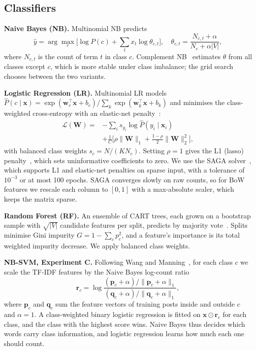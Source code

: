 \documentclass[conference]{IEEEtran}
\begin{document}
\subsection{Classifiers}

\textbf{Naive Bayes (NB).} Multinomial NB predicts
\begin{equation}
\hat{y}=\arg\max_c\Big[\log P(c)+\sum_t x_{t}\log\theta_{c,t}\Big],\quad
\theta_{c,t}=\frac{N_{c,t}+\alpha}{N_c+\alpha|V|},
\label{eq:nb}
\end{equation}
where $N_{c,t}$ is the count of term $t$ in class $c$. Complement NB~\cite{rennie2003tackling} estimates $\theta$ from all classes except $c$, which is more stable under class imbalance; the grid search chooses between the two variants.

\textbf{Logistic Regression (LR).} Multinomial LR models $\hat{P}(c\mid\mathbf{x})=\exp(\mathbf{w}_c^\top\mathbf{x}+b_c)/\sum_k\exp(\mathbf{w}_k^\top\mathbf{x}+b_k)$ and minimises the class-weighted cross-entropy with an elastic-net penalty~\cite{zou2005elasticnet}:
\begin{equation}
\begin{split}
\mathcal{L}(\mathbf{W})={}&-\sum_i s_{y_i}\log \hat{P}(y_i\mid\mathbf{x}_i)\\
&+\frac{1}{C}\Big[\rho\lVert \mathbf{W}\rVert_1+\frac{1-\rho}{2}\lVert \mathbf{W}\rVert_2^2\Big],
\end{split}
\label{eq:lr}
\end{equation}
with balanced class weights $s_c=N/(K N_c)$. Setting $\rho=1$ gives the L1 (lasso) penalty~\cite{tibshirani1996lasso}, which sets uninformative coefficients to zero. We use the SAGA solver~\cite{defazio2014saga}, which supports L1 and elastic-net penalties on sparse input, with a tolerance of $10^{-3}$ or at most 100 epochs. SAGA converges slowly on raw counts, so for BoW features we rescale each column to $[0,1]$ with a max-absolute scaler, which keeps the matrix sparse.

\textbf{Random Forest (RF).} An ensemble of CART trees, each grown on a bootstrap sample with $\sqrt{|V|}$ candidate features per split, predicts by majority vote~\cite{breiman2001rf}. Splits minimise Gini impurity $G=1-\sum_c p_c^2$, and a feature's importance is its total weighted impurity decrease. We apply balanced class weights.

\textbf{NB-SVM, Experiment C.} Following Wang and Manning~\cite{wang2012baselines}, for each class $c$ we scale the TF-IDF features by the Naive Bayes log-count ratio
\begin{equation}
\mathbf{r}_c=\log\frac{(\mathbf{p}_c+\alpha)/\lVert\mathbf{p}_c+\alpha\rVert_1}{(\mathbf{q}_c+\alpha)/\lVert\mathbf{q}_c+\alpha\rVert_1},
\label{eq:nbsvm}
\end{equation}
where $\mathbf{p}_c$ and $\mathbf{q}_c$ sum the feature vectors of training posts inside and outside $c$ and $\alpha=1$. A class-weighted binary logistic regression is fitted on $\mathbf{x}\odot\mathbf{r}_c$ for each class, and the class with the highest score wins. Naive Bayes thus decides which words carry class information, and logistic regression learns how much each one should count.
\end{document}
